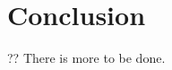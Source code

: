 \documentclass[sigconf]{acmart}
\begin{document}
\section{Conclusion}

?? There is more to be done.

\FloatBarrier



\end{document}

